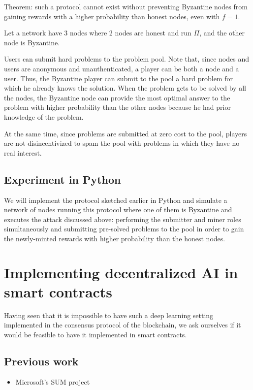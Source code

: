 \documentclass[conference]{IEEEtran}
\begin{document}
Theorem: such a protocol cannot exist without preventing Byzantine nodes from gaining rewards with a higher probability than honest nodes, even with $f=1$.

Let a network have 3 nodes where 2 nodes are honest and run $\Pi$, and the other node is Byzantine.

Users can submit hard problems to the problem pool. Note that, since nodes and users are anonymous and unauthenticated, a player can be both a node and a user. Thus, the Byzantine player can submit to the pool a hard problem for which he already knows the solution. When the problem gets to be solved by all the nodes, the Byzantine node can provide the most optimal answer to the problem with higher probability than the other nodes because he had prior knowledge of the problem.

At the same time, since problems are submitted at zero cost to the pool, players are not disincentivized to spam the pool with problems in which they have no real interest.

\subsection{Experiment in Python}

We will implement the protocol sketched earlier in Python and simulate a network of nodes running this protocol where one of them is Byzantine and executes the attack discussed above: performing the submitter and miner roles simultaneously and submitting pre-solved problems to the pool in order to gain the newly-minted rewards with higher probability than the honest nodes.

\section{Implementing decentralized AI in smart contracts}

Having seen that it is impossible to have such a deep learning setting implemented in the consensus protocol of the blockchain, we ask ourselves if it would be feasible to have it implemented in smart contracts.

\subsection{Previous work}

\begin{itemize}
\item Microsoft's SUM project
\end{itemize}
\end{document}
